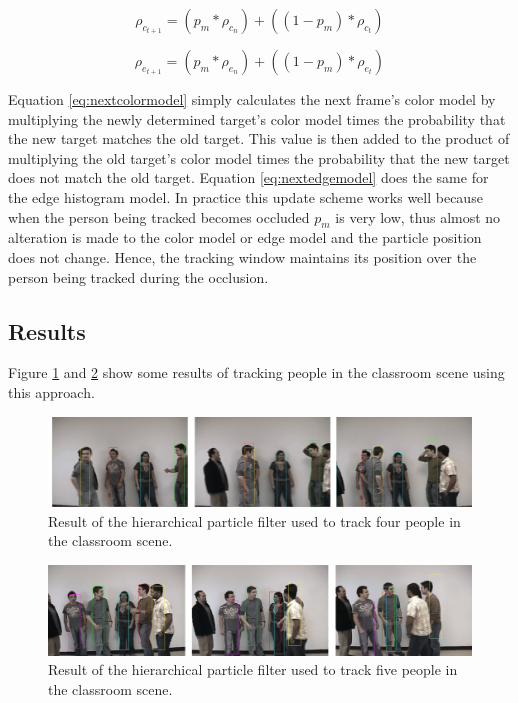 \documentclass[11pt]{article}
\begin{document}
\begin{equation}
\rho_{c_{t+1}} = (p_m * \rho_{c_{n}}) + ((1-p_m) * \rho_{c_{t}})
\label{eq:nextcolormodel}
\end{equation}

\begin{equation}
\rho_{e_{t+1}} = (p_m * \rho_{e_{n}}) + ((1-p_m) * \rho_{e_{t}})
\label{eq:nextedgemodel}
\end{equation}

Equation \ref{eq:nextcolormodel} simply calculates the next frame's color model by multiplying the newly determined target's color model times the probability that the new target matches the old target. This value is then added to the product of multiplying the old target's color model times the probability that the new target does not match the old target. Equation \ref{eq:nextedgemodel} does the same for the edge histogram model. In practice this update scheme works well because when the person being tracked becomes occluded $p_m$ is very low, thus almost no alteration is made to the color model or edge model and the particle position does not change. Hence, the tracking window maintains its position over the person being tracked during the occlusion.  


\subsection{Results}

Figure \ref{fig:hybridresult1} and \ref{fig:hybridresult2} show some results of tracking people in the classroom scene using this approach.

\begin{figure}[H]
\centering
\includegraphics[scale=.23]{img/hybrid1.jpg}
\caption{Result of the hierarchical particle filter used to track four people in the classroom scene.}
\label{fig:hybridresult1}
\end{figure}

\begin{figure}[H]
\centering
\includegraphics[scale=.23]{img/hybrid2.jpg}
\caption{Result of the hierarchical particle filter used to track five people in the classroom scene.}
\label{fig:hybridresult2}
\end{figure}
\end{document}
